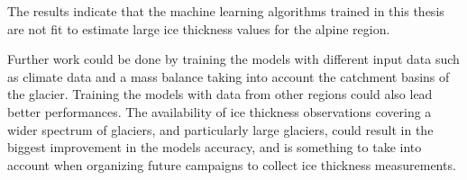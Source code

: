 The results indicate that the machine learning algorithms trained in this thesis are not fit to estimate large ice thickness values for the alpine region. 

Further work could be done by training the models with different input data such as climate data and a mass balance taking into account the catchment basins of the glacier. Training the models with data from other regions could also lead better performances. The availability of ice thickness observations covering a wider spectrum of glaciers, and particularly large glaciers, could result in the biggest improvement in the models accuracy, and is something to take into account when organizing future campaigns to collect ice thickness measurements. 
%
%
